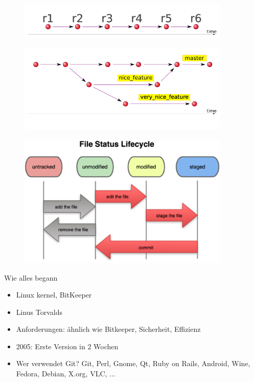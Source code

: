\documentclass{beamer}
\begin{document}
\begin{frame}
  \begin{figure}
   \includegraphics[width=0.90\textwidth]{./images/svn-timeline.png}
  \end{figure}

  \begin{figure}
   \includegraphics[width=0.90\textwidth]{./images/git-timeline.png}
  \end{figure}
\end{frame}

\begin{frame}
 \begin{figure}
  \includegraphics[width=0.90\textwidth]{./images/file-status-lifecycle.png}
 \end{figure}

\end{frame}

\begin{frame}[<+->]{Wie alles begann}{}
  \begin{itemize}
    \item Linux kernel, BitKeeper
    \item Linus Torvalds
    \item Anforderungen: ähnlich wie Bitkeeper, Sicherheit, Effizienz
    \item 2005: Erste Version in 2 Wochen
    \item Wer verwendet Git? Git, Perl, Gnome, Qt, Ruby on Rails, Android, Wine, Fedora, Debian, X.org, VLC, ...

  \end{itemize}
\end{frame}
\end{document}
